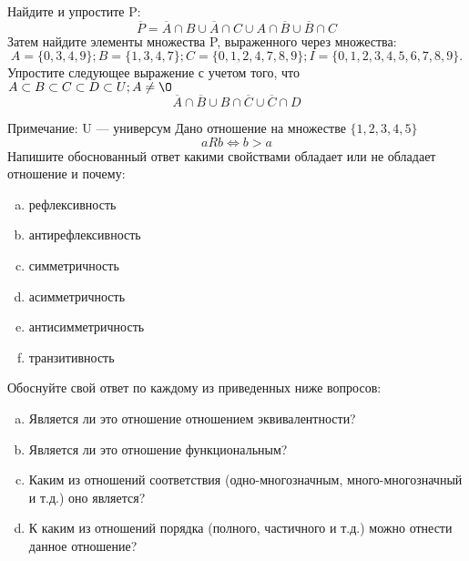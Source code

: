 \documentclass[10pt]{exam}
\begin{document}
\begin{questions}
\question
Найдите и упростите P:
\begin{equation*}
\overline{P} = \overline{A} \cap B \cup \overline{A} \cap C \cup A \cap \overline{B} \cup \overline{B} \cap C
\end{equation*}
Затем найдите элементы множества P, выраженного через множества:
\begin{equation*}
A = \{0, 3, 4, 9\}; 
B = \{1, 3, 4, 7\};
C = \{0, 1, 2, 4, 7, 8, 9\};
I = \{0, 1, 2, 3, 4, 5, 6, 7, 8, 9\}.
\end{equation*}\question
Упростите следующее выражение с учетом того, что $A\subset B \subset C \subset D \subset U; A \neq \O$
\begin{equation*}
\overline{A} \cap \overline{B} \cup B \cap \overline{C} \cup \overline{C} \cap D
\end{equation*}

Примечание: U — универсум\question
Дано отношение на множестве $\{1, 2, 3, 4, 5\}$ 
\begin{equation*}
aRb \iff b > a
\end{equation*}
Напишите обоснованный ответ какими свойствами обладает или не обладает отношение и почему:   
\begin{enumerate} [a)]\setcounter{enumi}{0}
\item рефлексивность
\item антирефлексивность
\item симметричность
\item асимметричность
\item антисимметричность
\item транзитивность
\end{enumerate}

Обоснуйте свой ответ по каждому из приведенных ниже вопросов:
\begin{enumerate} [a)]\setcounter{enumi}{0}
    \item Является ли это отношение отношением эквивалентности?
    \item Является ли это отношение функциональным?
    \item Каким из отношений соответствия (одно-многозначным, много-многозначный и т.д.) оно является?
    \item К каким из отношений порядка (полного, частичного и т.д.) можно отнести данное отношение?
\end{enumerate}


\end{questions}
\end{document}
